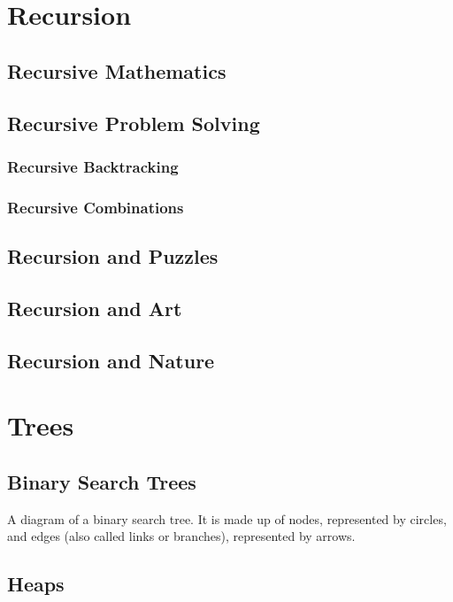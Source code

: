 \documentclass[10pt,a4paper]{book}
\begin{document}
\chapter{Recursion}

\section{Recursive Mathematics}

\section{Recursive Problem Solving}

\subsection{Recursive Backtracking}
\subsection{Recursive Combinations}



\section{Recursion and Puzzles}


\section{Recursion and Art}
\section{Recursion and Nature}


\chapter{Trees}


\section{Binary Search Trees}

A diagram of a binary search tree.  It is made up of nodes, represented by circles, and edges (also called links or branches), represented by arrows.  


\section{Heaps}
\end{document}
